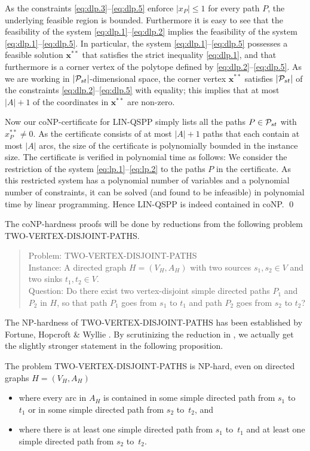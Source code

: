 As the constraints \eqref{eq:dlp.3}--\eqref{eq:dlp.5} enforce $|x_P|\le1$ for every path $P$, 
the underlying feasible region is bounded.
Furthermore it is easy to see that the feasibility of the system \eqref{eq:dlp.1}--\eqref{eq:dlp.2} 
implies the feasibility of the system \eqref{eq:dlp.1}--\eqref{eq:dlp.5}.
In particular, the system \eqref{eq:dlp.1}--\eqref{eq:dlp.5} possesses a feasible solution $\pmb x^{**}$ 
that satisfies the strict inequality \eqref{eq:dlp.1}, and 
that furthermore is a corner vertex of the polytope defined by \eqref{eq:dlp.2}--\eqref{eq:dlp.5}.
As we are working in $|{\cal P}_{st}|$-dimensional space, the corner vertex $\pmb x^{**}$ satisfies $|{\cal P}_{st}|$ of 
the constraints \eqref{eq:dlp.2}--\eqref{eq:dlp.5} with equality; this implies that at most $|A|+1$ 
of the coordinates in $\pmb x^{**}$ are non-zero.

Now our coNP-certificate for LIN-QSPP simply lists all the paths $P\in{\cal P}_{st}$ with $x^{**}_P\ne0$.
As the certificate consists of at most $|A|+1$ paths that each contain at most $|A|$ arcs, the
size of the certificate is polynomially bounded in the instance size.
The certificate is verified in polynomial time as follows:
We consider the restriction of the system \eqref{eq:lp.1}--\eqref{eq:lp.2} to the paths $P$ 
in the certificate.
As this restricted system has a polynomial number of variables and a polynomial number of constraints,
it can be solved (and found to be infeasible) in polynomial time by linear programming.
Hence LIN-QSPP is indeed contained in coNP.
\qed

\bigskip
The coNP-hardness proofs will be done by reductions from the following problem TWO-VERTEX-DISJOINT-PATHS.
\begin{quote}
Problem: TWO-VERTEX-DISJOINT-PATHS
\\[1.0ex]
Instance: A directed graph $H=(V_H,A_H)$ with two sources $s_1,s_2\in V$ and two sinks $t_1,t_2\in V$.
\\[1.0ex]
Question: Do there exist two vertex-disjoint simple directed paths $P_1$ and $P_2$ in $H$,
so that path $P_1$ goes from $s_1$ to $t_1$ and path $P_2$ goes from $s_2$ to $t_2$?
\end{quote}
The NP-hardness of TWO-VERTEX-DISJOINT-PATHS has been established by Fortune, Hopcroft \& Wyllie \cite{FoHoWy1980}.
By scrutinizing the reduction in \cite{FoHoWy1980}, we actually get the slightly stronger statement
in the following proposition.
\begin{proposition}
\label{pr:FHW}
\cite{FoHoWy1980}
The problem TWO-VERTEX-DIS\-JOINT-PATHS is NP-hard, even on directed graphs $H=(V_H,A_H)$
\begin{itemize}
\item where every arc in $A_H$ is contained in some simple directed path from $s_1$ to~$t_1$ 
or in some simple directed path from $s_2$ to~$t_2$, and
\item where there is at least one simple directed path from $s_1$ to~$t_1$ 
and at least one simple directed path from $s_2$ to~$t_2$.
\end{itemize}
\end{proposition}

